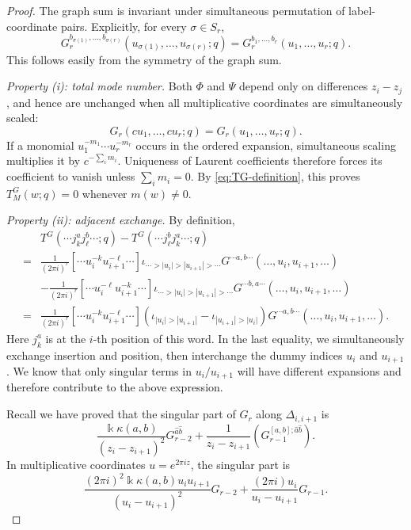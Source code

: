 \documentclass[11pt,a4paper]{amsart}
\numberwithin{equation}{section}
\theoremstyle{definition}
\theoremstyle{remark}
\newcommand{\kk}{\Bbbk}
\newcommand{\ii}{i}
\newcommand{\e}{e}
\begin{document}
\begin{proof}
The graph sum is invariant under simultaneous permutation of
label-coordinate pairs.  Explicitly, for every $\sigma\in S_r$,
\begin{equation*}
 G_r^{b_{\sigma(1)},\ldots,b_{\sigma(r)}}
 (u_{\sigma(1)},\ldots,u_{\sigma(r)};q)
 =G_r^{b_1,\ldots,b_r}(u_1,\ldots,u_r;q).
\end{equation*}
This follows easily from the symmetry of the graph sum.


\smallskip
\noindent\emph{Property (i): total mode number.}
Both $\Phi$ and $\Psi$ depend only on differences $z_i-z_j$, and hence are
unchanged when all multiplicative coordinates are simultaneously scaled:
\begin{equation*}
 G_r(cu_1,\ldots,cu_r;q)=G_r(u_1,\ldots,u_r;q).
\end{equation*}
If a monomial $u_1^{-m_1}\cdots u_r^{-m_r}$ occurs in the ordered
expansion, simultaneous scaling multiplies it by
$c^{-\sum_i m_i}$.  Uniqueness of Laurent coefficients therefore forces
its coefficient to vanish unless $\sum_i m_i=0$.  By
\eqref{eq:TG-definition}, this proves
$T^G_M(w;q)=0$ whenever $m(w)\neq0$.

\smallskip
\noindent\emph{Property (ii): adjacent exchange.}
By definition, 
\begin{align*}
 &T^G(\cdots j_k^a j_\ell^b\cdots;q)
 -T^G(\cdots j_\ell^b j_k^a\cdots;q)\\
 = &\frac{1}{(2\pi\ii)^r}[\cdots u_i^{-k}u_{i+1}^{-\ell}\cdots]\iota_{\cdots >|u_i|>|u_{i+1}|>\cdots}G^{\cdots a,b\cdots}(\ldots, u_i,u_{i+1},\ldots)\\
 & -\frac{1}{(2\pi\ii)^r}[\cdots u_i^{-\ell}u_{i+1}^{-k}\cdots]\iota_{\cdots >|u_i|>|u_{i+1}|>\cdots}G^{\cdots b,a\cdots}(\ldots, u_i,u_{i+1},\ldots)\\
  =&  \frac{1}{(2\pi\ii)^r}[\cdots u_i^{-k}u_{i+1}^{-\ell}\cdots]\left(\iota_{|u_i|>|u_{i+1}|}-\iota_{|u_{i+1}|>|u_{i}|}\right)G^{\cdots a,b\cdots}(\ldots, u_i,u_{i+1},\ldots).
\end{align*}
Here $j^a_k$ is at the $i$-th position of this word. In the last equality, we simultaneously exchange insertion and position, then interchange the dummy indices $u_i$ and $u_{i+1}$. We know that only singular terms in $u_i/u_{i+1}$ will have different expansions and therefore contribute to the above expression.


Recall we have proved that the singular part of $G_r$ along $\Delta_{i,i+1}$ is
\begin{equation}
\frac{\kk\kappa(a,b)}{(z_i-z_{i+1})^2}G^{\widehat{a}\widehat{b}}_{r-2}+\frac1{z_i-z_{i+1}}
 \left(G^{[a,b];\widehat{a}\widehat{b}}_{r-1}\right).
 \label{eq:graph-additive-OPE}
\end{equation}
In multiplicative coordinates $u=\e^{2\pi\ii z}$, the singular part is
\begin{equation}
\frac{(2\pi\ii)^2\kk\kappa(a,b)u_i u_{i+1}}{(u_i-u_{i+1})^2}
 G_{r-2} +\frac{(2\pi\ii)u_i}{u_i-u_{i+1}}G_{r-1}.
 \label{eq:graph-multiplicative-OPE}
\end{equation}


\end{proof}
\end{document}
